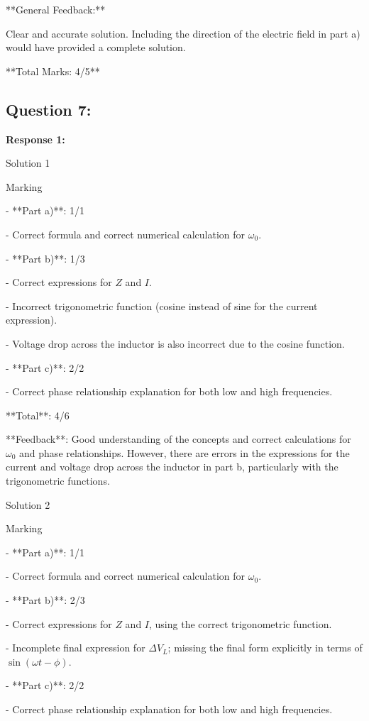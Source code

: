 \documentclass[a4paper,11pt]{article}
\begin{document}
**General Feedback:**

Clear and accurate solution. Including the direction of the electric field in part a) would have provided a complete solution.

**Total Marks: 4/5**

\subsection*{Question 7:}

\textbf{Response 1:}

Solution 1

Marking

- **Part a)**: 1/1

  - Correct formula and correct numerical calculation for \(\omega_0\).
  
- **Part b)**: 1/3

  - Correct expressions for \(Z\) and \(I\).
  
  - Incorrect trigonometric function (cosine instead of sine for the current expression).
  
  - Voltage drop across the inductor is also incorrect due to the cosine function.
  
- **Part c)**: 2/2

  - Correct phase relationship explanation for both low and high frequencies.

**Total**: 4/6

**Feedback**: Good understanding of the concepts and correct calculations for \(\omega_0\) and phase relationships. However, there are errors in the expressions for the current and voltage drop across the inductor in part b, particularly with the trigonometric functions.

Solution 2

Marking

- **Part a)**: 1/1

  - Correct formula and correct numerical calculation for \(\omega_0\).
  
- **Part b)**: 2/3

  - Correct expressions for \(Z\) and \(I\), using the correct trigonometric function.
  
  - Incomplete final expression for \(\Delta V_L\); missing the final form explicitly in terms of \(\sin(\omega t - \phi)\).
  
- **Part c)**: 2/2

  - Correct phase relationship explanation for both low and high frequencies.
\end{document}
